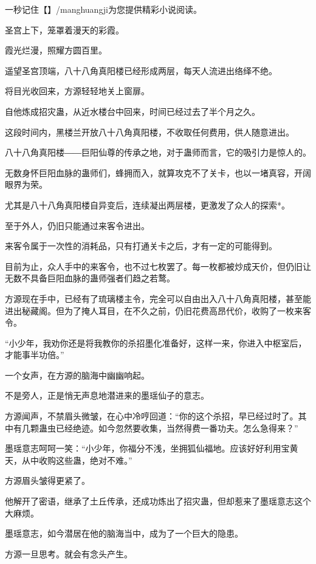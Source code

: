 
\begin{this_body}

一秒记住【】/manghuangji为您提供精彩小说阅读。

圣宫上下，笼罩着漫天的彩霞。

霞光烂漫，照耀方圆百里。

遥望圣宫顶端，八十八角真阳楼已经形成两层，每天人流进出络绎不绝。

将目光收回来，方源轻轻地关上窗扉。

自他炼成招灾蛊，从近水楼台中回来，时间已经过去了半个月之久。

这段时间内，黑楼兰开放八十八角真阳楼，不收取任何费用，供人随意进出。

八十八角真阳楼――巨阳仙尊的传承之地，对于蛊师而言，它的吸引力是惊人的。

无数身怀巨阳血脉的蛊师们，蜂拥而入，就算攻克不了关卡，也以一堵真容，开阔眼界为荣。

尤其是八十八角真阳楼自异变后，连续凝出两层楼，更激发了众人的探索*。

至于外人，仍旧只能通过来客令进出。

来客令属于一次性的消耗品，只有打通关卡之后，才有一定的可能得到。

目前为止，众人手中的来客令，也不过七枚罢了。每一枚都被炒成天价，但仍旧让无数不具备巨阳血脉的蛊师强者们趋之若鹜。

方源现在手中，已经有了琉璃楼主令，完全可以自由出入八十八角真阳楼，甚至能进出秘藏阁。但为了掩人耳目，在不久之前，仍旧花费高昂代价，收购了一枚来客令。

“小少年，我劝你还是将我教你的杀招墨化准备好，这样一来，你进入中枢室后，才能事半功倍。”

一个女声，在方源的脑海中幽幽响起。

不是旁人，正是悄无声息地潜进来的墨瑶仙子的意志。

方源闻声，不禁眉头微皱，在心中冷哼回道：“你的这个杀招，早已经过时了。其中有几颗蛊虫已经绝迹。如今忽然要收集，当然得费一番功夫。怎么急得来？”

墨瑶意志呵呵一笑：“小少年，你福分不浅，坐拥狐仙福地。应该好好利用宝黄天，从中收购这些蛊，绝对不难。”

方源眉头皱得更紧了。

他解开了密语，继承了土丘传承，还成功炼出了招灾蛊，但却惹来了墨瑶意志这个大麻烦。

墨瑶意志，如今潜居在他的脑海当中，成为了一个巨大的隐患。

方源一旦思考。就会有念头产生。


\end{this_body}
